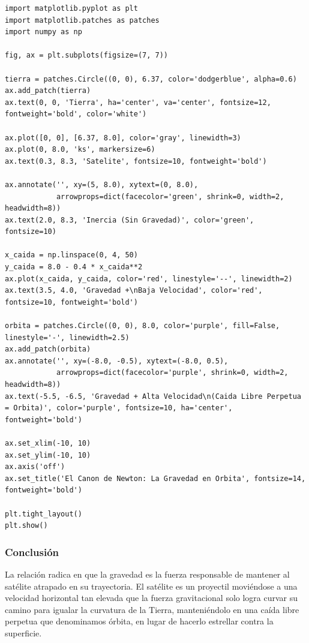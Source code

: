 \documentclass[12pt]{article}
\begin{document}
\begin{lstlisting}
import matplotlib.pyplot as plt
import matplotlib.patches as patches
import numpy as np

fig, ax = plt.subplots(figsize=(7, 7))

tierra = patches.Circle((0, 0), 6.37, color='dodgerblue', alpha=0.6)
ax.add_patch(tierra)
ax.text(0, 0, 'Tierra', ha='center', va='center', fontsize=12, fontweight='bold', color='white')

ax.plot([0, 0], [6.37, 8.0], color='gray', linewidth=3)
ax.plot(0, 8.0, 'ks', markersize=6)
ax.text(0.3, 8.3, 'Satelite', fontsize=10, fontweight='bold')

ax.annotate('', xy=(5, 8.0), xytext=(0, 8.0),
            arrowprops=dict(facecolor='green', shrink=0, width=2, headwidth=8))
ax.text(2.0, 8.3, 'Inercia (Sin Gravedad)', color='green', fontsize=10)

x_caida = np.linspace(0, 4, 50)
y_caida = 8.0 - 0.4 * x_caida**2
ax.plot(x_caida, y_caida, color='red', linestyle='--', linewidth=2)
ax.text(3.5, 4.0, 'Gravedad +\nBaja Velocidad', color='red', fontsize=10, fontweight='bold')

orbita = patches.Circle((0, 0), 8.0, color='purple', fill=False, linestyle='-', linewidth=2.5)
ax.add_patch(orbita)
ax.annotate('', xy=(-8.0, -0.5), xytext=(-8.0, 0.5),
            arrowprops=dict(facecolor='purple', shrink=0, width=2, headwidth=8))
ax.text(-5.5, -6.5, 'Gravedad + Alta Velocidad\n(Caida Libre Perpetua = Orbita)', color='purple', fontsize=10, ha='center', fontweight='bold')

ax.set_xlim(-10, 10)
ax.set_ylim(-10, 10)
ax.axis('off')
ax.set_title('El Canon de Newton: La Gravedad en Orbita', fontsize=14, fontweight='bold')

plt.tight_layout()
plt.show()
\end{lstlisting}

\subsubsection*{Conclusión}
La relación radica en que la gravedad es la fuerza responsable de mantener al satélite atrapado en su trayectoria. El satélite es un proyectil moviéndose a una velocidad horizontal tan elevada que la fuerza gravitacional solo logra curvar su camino para igualar la curvatura de la Tierra, manteniéndolo en una caída libre perpetua que denominamos órbita, en lugar de hacerlo estrellar contra la superficie.

\newpage
\end{document}
